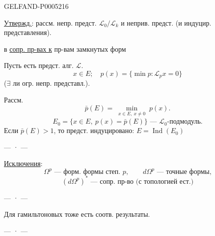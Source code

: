 \begin{GelfandAdjacentEvidence}{GELFAND-P000521}{6}


\uline{Утвержд.}: рассм. непр. предст. $\mathcal L_0/\mathcal L_k$
и неприв. предст. (и индуцир. представления).

 в \uline{сопр. пр-вах к} пр-вам замкнутых форм

Пусть есть предст. алг. $\mathcal L$.
\[
x\in E;\quad p(x)=\{\min p:\mathcal L_p x=0\}
\]
($\exists$ ли огр. непр. представл.).

Рассм.
\[
\bar p(E)=\min_{\substack{x\in E,\ x\ne0}}p(x).
\]
\[
E_0=\{x\in E,\ p(x)=\bar p(E)\}\text{ — }\mathcal L_0\text{-подмодуль}.
\]
Если $\bar p(E)>1$, то предст. индуцировано: $E=\operatorname{Ind}(E_0)$
\end{GelfandAdjacentEvidence}


\begin{center}— · —\end{center}
\uline{Исключения}:
\[
\Omega^p\text{ — форм. формы степ. }p,\qquad
d\Omega^p\text{ — точные формы,}
\]
\[
(d\Omega^p)^*\text{ — сопр. пр-во (с топологией ест.)}
\]
\begin{center}— · —\end{center}
Для гамильтоновых тоже есть соотв. результаты.
\begin{center}— · —\end{center}


